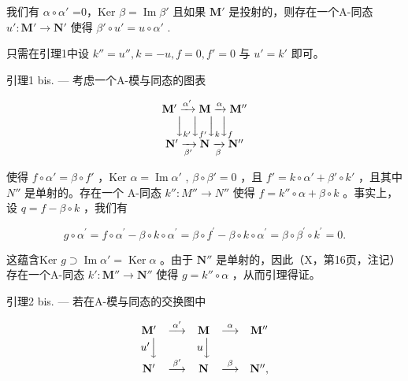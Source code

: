 我们有 \(\alpha\circ\alpha'\) =0，Ker \(\beta=\operatorname{Im}\beta'\) 且如果 \(\mathbf{M}'\) 是投射的，则存在一个A-同态 \(u':\mathbf{M}'\to\mathbf{N}'\) 使得 \(\beta'\circ u'=u\circ\alpha'\) .

只需在引理1中设 \(k'' = u'', k = -u, f = 0, f' = 0\) 与 \(u' = k'\) 即可。

引理1 bis. --- 考虑一个A-模与同态的图表

\[
\begin{array}{c} \mathbf {M} ^ {\prime} \xrightarrow {\alpha^ {\prime}} \mathbf {M} \xrightarrow {\alpha} \mathbf {M} ^ {\prime \prime} \\ \Big \downarrow_ {k ^ {\prime}} \Big \downarrow_ {f ^ {\prime}} \Big \downarrow_ {k} \Big \downarrow_ {f} \\ \mathbf {N} ^ {\prime} \xrightarrow [ \beta^ {\prime} ]{} \mathbf {N} \xrightarrow [ \beta ]{} \mathbf {N} ^ {\prime \prime} \end{array}
\]

使得 \(f \circ \alpha' = \beta \circ f'\) ，Ker \(\alpha = \operatorname{Im} \alpha'\) , \(\beta \circ \beta' = 0\) ，且 \(f' = k \circ \alpha' + \beta' \circ k'\) ，且其中 \(N''\) 是单射的。存在一个 A-同态 \(k'' : M'' \to N''\) 使得 \(f = k'' \circ \alpha + \beta \circ k\) 。事实上，设 \(q = f - \beta \circ k\) ，我们有

\[
g \circ \alpha^ {\prime} = f \circ \alpha^ {\prime} - \beta \circ k \circ \alpha^ {\prime} = \beta \circ f ^ {\prime} - \beta \circ k \circ \alpha^ {\prime} = \beta \circ \beta^ {\prime} \circ k ^ {\prime} = 0.
\]

这蕴含Ker \(g \supset \operatorname{Im} \alpha' = \operatorname{Ker} \alpha\) 。由于 \(\mathbf{N}''\) 是单射的，因此（X，第16页，注记）存在一个A-同态 \(k': \mathbf{M}'' \to \mathbf{N}''\) 使得 \(g = k'' \circ \alpha\) ，从而引理得证。

引理2 bis. --- 若在A-模与同态的交换图中

\[
\begin{array}{c c c c c} \mathbf {M} ^ {\prime} & \stackrel {{\alpha^ {\prime}}} {{\longrightarrow}} & \mathbf {M} & \stackrel {{\alpha}} {{\longrightarrow}} & \mathbf {M} ^ {\prime \prime} \\ u ^ {\prime} \Big \downarrow & & u \Big \downarrow & & \\ \mathbf {N} ^ {\prime} & \stackrel {{\beta^ {\prime}}} {{\longrightarrow}} & \mathbf {N} & \stackrel {{\beta}} {{\longrightarrow}} & \mathbf {N} ^ {\prime \prime}, \end{array}
\]

